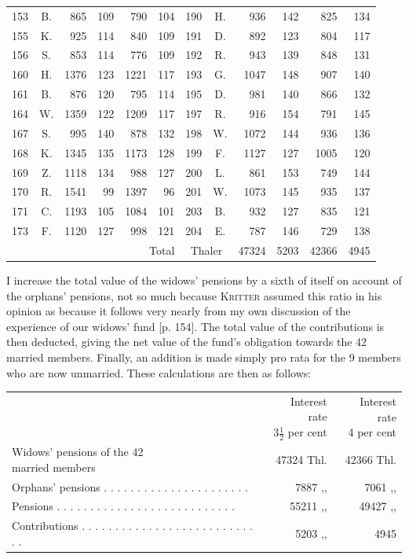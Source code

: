 \begin{center}
\begin{tabular}{r|c|r|r|r|r||r|c|r|r|r|r}
153&B.&865&109&790&104&190&H.&936&142&825&134\\
155&K.&925&114&840&109&191&D.&892&123&804&117\\
156&S.&853&114&776&109&192&R.&943&139&848&131\\
160&H.&1376&123&1221&117&193&G.&1047&148&907&140\\
161&B.&876&120&795&114&195&D.&981&140&866&132\\
164&W.&1359&122&1209&117&197&R.&916&154&791&145\\
167&S.&995&140&878&132&198&W.&1072&144&936&136\\
168&K.&1345&135&1173&128&199&F.&1127&127&1005&120\\
169&Z.&1118&134&988&127&200&L.&861&153&749&144\\
170&R.&1541&99&1397&96&201&W.&1073&145&935&137\\
171&C.&1193&105&1084&101&203&B.&932&127&835&121\\
173&F.&1120&127&998&121&204&E.&787&146&729&138\\\cline{6-12}
\multicolumn{6}{r}{Total}&\multicolumn{2}{c|}{Thaler}&47324&5203&42366&4945
\end{tabular}
\end{center}
\noindent\hspace*{\parindent}I increase the total value of the widows' pensions by a sixth of itself on account of the orphans' pensions, not so much because \textsc{Kritter} assumed this ratio in his opinion as because it follows very nearly from my own discussion of the experience of our widows' fund [p. 154]. The total value of the contributions is then deducted, giving the net value of the fund's obligation towards the 42 married members. Finally, an addition is made simply pro rata for the 9 members who are now unmarried. These calculations are then as follows:
\begin{center}
\footnotesize\setlength{\tabcolsep}{3pt}
\begin{tabular}{l r|r}
&\shortstack{Interest rate\\\(3\tfrac{1}{2}\) per cent}&\shortstack{Interest rate\\4 per cent}\\
\shortstack[l]{Widows' pensions of the 42\\married members}&47324 Thl.&42366 Thl.\\
Orphans' pensions . . . . . . . . . . . . . . . . . . . . . .&7887 ,, &7061 ,, \\[5pt]
Pensions . . . . . . . . . . . . . . . . . . . . . . . . . . .&55211 ,, &49427 ,, \\
Contributions . . . . . . . . . . . . . . . . . . . . . . . . . . . .&5203 ,, &4945
\end{tabular}
\end{center}
